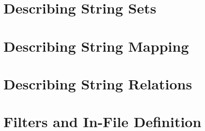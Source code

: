 
\section{Describing String Sets}


\section{Describing String Mapping}

\label{Ref:Key:Map}


\section{Describing String Relations}


\section{Filters and In-File Definition}





